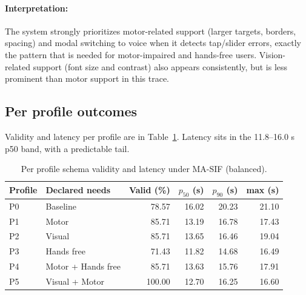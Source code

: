 \paragraph{Interpretation:} The system strongly prioritizes motor-related support (larger targets, borders, spacing) and modal switching to voice when it detects tap/slider errors, exactly the pattern that is needed for motor-impaired and hands-free users. Vision-related support (font size and contrast) also appears consistently, but is less prominent than motor support in this trace.


\subsection{Per profile outcomes}
Validity and latency per profile are in Table~\ref{tab:per-profile}. Latency sits in the 11.8–16.0 s p50 band, with a predictable tail.

\begin{table}[H]
\centering
\caption{Per profile schema validity and latency under MA-SIF (balanced).}
\label{tab:per-profile}
\begin{tabular}{l l r r r r}
\toprule
\textbf{Profile} & \textbf{Declared needs} & \textbf{Valid (\%)} & \textbf{$p_{50}$ (s)} & \textbf{$p_{90}$ (s)} & \textbf{max (s)} \\
\midrule
P0 & Baseline & 78.57 & 16.02 & 20.23 & 21.10 \\
P1 & Motor & 85.71 & 13.19 & 16.78 & 17.43 \\
P2 & Visual & 85.71 & 13.65 & 16.46 & 19.04 \\
P3 & Hands free & 71.43 & 11.82 & 14.68 & 16.49 \\
P4 & Motor + Hands free & 85.71 & 13.63 & 15.76 & 17.91 \\
P5 & Visual + Motor & 100.00 & 12.70 & 16.25 & 16.60 \\
\bottomrule
\end{tabular}
\end{table}

